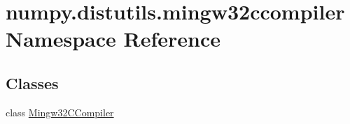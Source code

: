 \hypertarget{namespacenumpy_1_1distutils_1_1mingw32ccompiler}{}\section{numpy.\+distutils.\+mingw32ccompiler Namespace Reference}
\label{namespacenumpy_1_1distutils_1_1mingw32ccompiler}
\subsection*{Classes}
\begin{DoxyCompactItemize}
\item 
class \hyperlink{classnumpy_1_1distutils_1_1mingw32ccompiler_1_1Mingw32CCompiler}{Mingw32\+C\+Compiler}
\end{DoxyCompactItemize}
